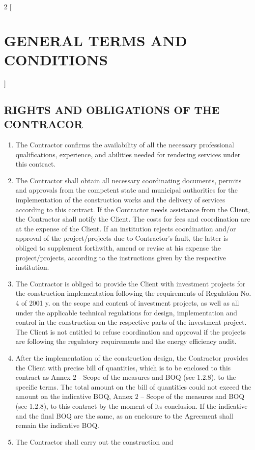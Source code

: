 \begin{multicols}{2} [\section{GENERAL TERMS AND CONDITIONS}]
  \subsection{RIGHTS AND OBLIGATIONS OF THE CONTRACOR}
  \begin{enumerate}
  \item The Contractor confirms the availability of all the necessary
    professional qualifications, experience, and abilities needed for
    rendering services under this contract.
  \item The Contractor shall obtain all necessary coordinating
    documents, permits and approvals from the competent state and
    municipal authorities for the implementation of the construction
    works and the delivery of services according to this contract. If
    the Contractor needs assistance from the Client, the Contractor
    shall notify the Client. The costs for fees and coordination are
    at the expense of the Client. If an institution rejects
    coordination and/or approval of the project/projects due to
    Contractor’s fault, the latter is obliged to supplement forthwith,
    amend or revise at his expense the project/projects, according to
    the instructions given by the respective institution.
  \item The Contractor is obliged to provide the Client with
    investment projects for the construction implementation following
    the requirements of Regulation No. 4 of 2001 y. on the scope and
    content of investment projects, as well as all under the
    applicable technical regulations for design, implementation and
    control in the construction on the respective parts of the
    investment project. The Client is not entitled to refuse
    coordination and approval if the projects are following the
    regulatory requirements and the energy efficiency audit.
  \item After the implementation of the construction design, the
    Contractor provides the Client with precise bill of quantities,
    which is to be enclosed to this contract as Annex 2 {-} Scope of
    the measures and BOQ (see 1.2.8), to the specific terms. The total
    amount on the bill of quantities could not exceed the amount on
    the indicative BOQ, Annex 2 – Scope of the measures and BOQ (see
    1.2.8), to this contract by the moment of its conclusion. If the
    indicative and the final BOQ are the same, as an enclosure to the
    Agreement shall remain the indicative BOQ.
  \item The Contractor shall carry out the construction and

\end{enumerate}
\end{multicols}
